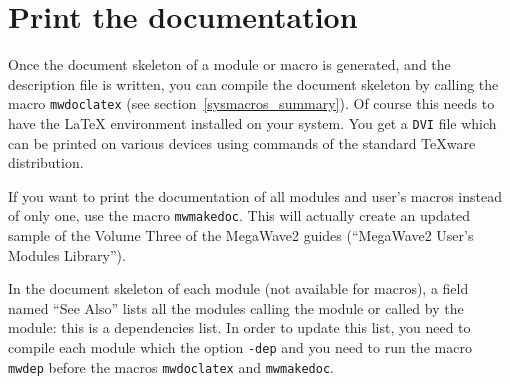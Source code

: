 \section{Print the documentation}
\label{document_print}

Once the document skeleton of a module or macro is generated, and the description file is
written, you can compile the document skeleton by calling the macro \verb+mwdoclatex+
 (see section~\ref{sysmacros_summary}).
Of course this needs to have the \LaTeX{} environment installed on your system.
You get a \verb+DVI+ file which can be printed on various devices using commands of the standard TeXware distribution.

If you want to print the documentation of all modules and user's macros instead of only one,
use the macro \verb+mwmakedoc+. 
This will actually create an updated sample of the Volume Three of the MegaWave2 guides (``MegaWave2 User's Modules Library'').

In the document skeleton of each module (not available for macros), a field named 
``See Also'' lists all the modules calling the module or called by the module: 
this is a dependencies list. In order to update this
list, you need to compile each module which the option \verb+-dep+ and you need to
run the macro \verb+mwdep+ before the macros \verb+mwdoclatex+ and \verb+mwmakedoc+.

